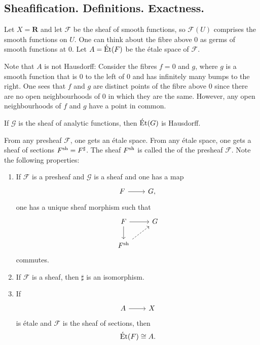 \documentclass [11 pt, oneside] {article}
\begin{document}
\subsection{Sheafification. Definitions. Exactness.}
\begin{example}[ ]\label{}\text{}
Let $X=\mathbf{R}$ and let $\mathscr{F}$ be the sheaf of smooth functions, so $\mathscr{F}(U)$ comprises the smooth functions on $U$. One can think about the fibre above $0$ as germs of smooth functions at $0$. Let $A = \operatorname{\acute Et} ( \relax{F})$ be the \'etale space of $\mathscr{F}$. 

Note that $A$ is not Hausdorff: Consider the fibres $f=0$ and $g$, where $g$ is a smooth function that is $0$ to the left of $0$ and has infinitely many bumps to the right. 
One sees that $f$ and $g$ are distinct points of the fibre above $0$ since there are no open neighbourhoods of $0$ in which they are the same. However, any open neighbourhoods of $f$ and $g$ have a point in common.

If $\mathscr{G}$ is the sheaf of analytic functions, then $\operatorname{\acute Et}(\relax{G})$ is Hausdorff.
\end{example}

From any presheaf $\mathscr{F}$, one gets an \'etale space. From any \'etale space, one gets a sheaf of sections $\relax{F}^{\textup {sh}} = \relax{F}^\sharp$. The sheaf $\relax{F}^{\textup {sh}}$ is called the  of the presheaf $\mathscr{F}$. Note the following properties:
\begin{enumerate}
	\item If $\mathscr{F}$ is a presheaf and $\mathscr{G}$ is a sheaf and one has a map 
	\[
\begin{tikzcd}
\mathscr{F}\ar[r]& \mathscr{G},
\end{tikzcd}
\]
	one has a unique sheaf morphism such that
		\[
		\begin{tikzcd}
			\mathscr{F} \ar[r] \ar[d] & \mathscr{G}\\
			\mathscr{F}\sh \ar[ur, dashed]
		\end{tikzcd}
		\]
		commutes.
	\item If $\mathscr{F}$ is a sheaf, then $\sharp$ is an isomorphism. 
	\item If 
	\[
\begin{tikzcd}
A\ar[r]&X
\end{tikzcd}
\]
is \'etale and $\mathscr{F}$ is the sheaf of sections, then
		\begin{align*}
			\operatorname{\acute Et} ( \relax{F} ) \cong A.
		\end{align*}
\end{enumerate}
\end{document}
